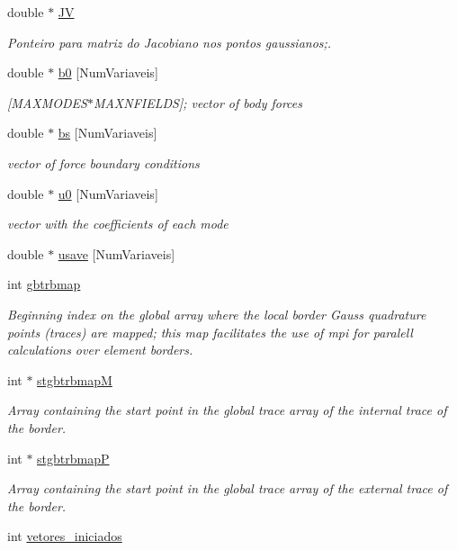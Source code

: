 \begin{DoxyCompactItemize}
double $\ast$ \hyperlink{classPhElem_a569278e8b30ca90d0e6f920b5bba7dd5}{JV}
\begin{DoxyCompactList}\small\item\em Ponteiro para matriz do Jacobiano nos pontos gaussianos;. \end{DoxyCompactList}\item 
double $\ast$ \hyperlink{classPhElem_aeaebffae27dd713bbc06ad07b7b727a3}{b0} \mbox{[}Num\+Variaveis\mbox{]}
\begin{DoxyCompactList}\small\item\em \mbox{[}M\+A\+X\+M\+O\+D\+E\+S$\ast$\+M\+A\+X\+N\+F\+I\+E\+L\+DS\mbox{]}; vector of body forces \end{DoxyCompactList}\item 
double $\ast$ \hyperlink{classPhElem_a42b747116ec9223cdebbc424e27f4089}{bs} \mbox{[}Num\+Variaveis\mbox{]}
\begin{DoxyCompactList}\small\item\em vector of force boundary conditions \end{DoxyCompactList}\item 
double $\ast$ \hyperlink{classPhElem_a560dc47ac8a684d84b05851ce52e044b}{u0} \mbox{[}Num\+Variaveis\mbox{]}
\begin{DoxyCompactList}\small\item\em vector with the coefficients of each mode \end{DoxyCompactList}\item 
double $\ast$ \hyperlink{classPhElem_a98781f3744597bad01eff75b31734d4b}{usave} \mbox{[}Num\+Variaveis\mbox{]}
\item 
int \hyperlink{classPhElem_a8188f64662092eb065a85d49f3ae6649}{gbtrbmap}
\begin{DoxyCompactList}\small\item\em Beginning index on the global array where the local border Gauss quadrature points (traces) are mapped; this map facilitates the use of mpi for paralell calculations over element borders. \end{DoxyCompactList}\item 
int $\ast$ \hyperlink{classPhElem_aebcf76eedfef93aef801fa3cab9c2708}{stgbtrbmapM}
\begin{DoxyCompactList}\small\item\em Array containing the start point in the global trace array of the internal trace of the border. \end{DoxyCompactList}\item 
int $\ast$ \hyperlink{classPhElem_a6b38afded290e7a4cfb4a215a7ebec4e}{stgbtrbmapP}
\begin{DoxyCompactList}\small\item\em Array containing the start point in the global trace array of the external trace of the border. \end{DoxyCompactList}\item 
int \hyperlink{classPhElem_a65f545dc1bf0d90240419934eb711a9d}{vetores\+\_\+iniciados}
\end{DoxyCompactItemize}
